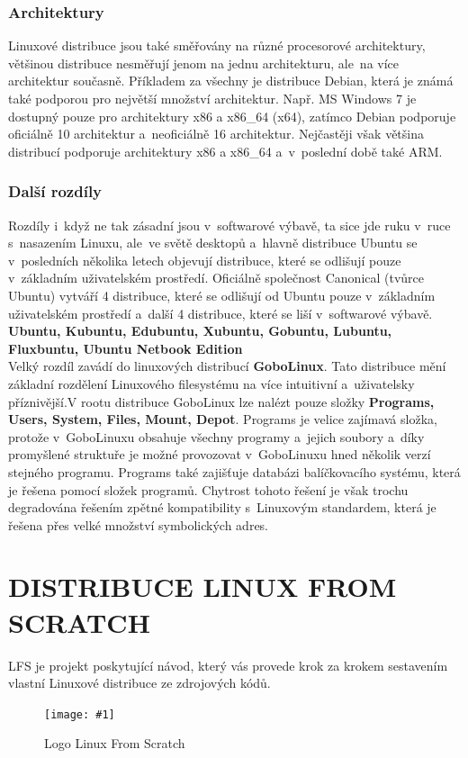 \documentclass[a4paper,12pt]{article}
\newcommand{\upc}[1]{\uppercase{#1}} %
\newcommand{\obr}[3]{%
	\begin{figure}[h]
	\center\texttt{[image: \#1]}
	\caption{#3}
	\end{figure}
	}
\renewcommand{\b}[1]{\textbf{#1}} %
\begin{document}
\subsubsection{Architektury}
Linuxové distribuce jsou také směřovány na různé procesorové architektury, většinou distribuce nesměřují jenom na jednu architekturu, ale~na více architektur současně. Příkladem za všechny je distribuce Debian, která je známá také podporou pro největší množství architektur. Např. MS Windows 7 je dostupný pouze pro architektury x86 a x86\_64 (x64), zatímco Debian podporuje oficiálně 10 architektur a~neoficiálně 16 architektur. Nejčastěji však většina distribucí podporuje architektury x86 a x86\_64 a~v~poslední době také ARM.

\subsubsection{Další rozdíly}
Rozdíly i~když ne tak zásadní jsou v~softwarové výbavě, ta sice jde ruku v~ruce s~nasazením Linuxu, ale~ve světě desktopů a~hlavně distribuce Ubuntu se v~posledních několika letech objevují distribuce, které se odlišují pouze v~základním uživatelském prostředí. Oficiálně společnost Canonical (tvůrce Ubuntu) vytváří 4 distribuce, které se odlišují od Ubuntu pouze v~základním uživatelském prostředí a~další 4 distribuce, které se liší v~softwarové výbavě.
\b{Ubuntu, Kubuntu, Edubuntu, Xubuntu, Gobuntu, Lubuntu, Fluxbuntu, Ubuntu Netbook Edition}\\

Velký rozdíl zavádí do linuxových distribucí \textbf{GoboLinux}. Tato distribuce mění základní rozdělení Linuxového filesystému na více intuitivní a~uživatelsky příznivější.V rootu distribuce GoboLinux lze nalézt pouze složky \b{Programs, Users, System, Files, Mount, Depot}. Programs je velice zajímavá složka, protože v~GoboLinuxu obsahuje všechny programy a~jejich soubory a~díky promyšlené struktuře je možné provozovat v~GoboLinuxu hned několik verzí stejného programu. Programs také zajišťuje databázi balíčkovacího systému, která je řešena pomocí složek programů. Chytrost tohoto řešení je však trochu degradována řešením zpětné kompatibility s~Linuxovým standardem, která je řešena přes velké množství symbolických adres.~\cite{GoboLinuxFilesystem}~\cite{GoboLinuxMain}

\section{\upc{Distribuce Linux from scratch}}
LFS je projekt poskytující návod, který vás provede krok za krokem sestavením vlastní Linuxové distribuce ze zdrojových kódů.~\cite{LFSwMAIN}
\obr{./img/lfs-logo.png}{1}{Logo Linux From Scratch}
\end{document}
